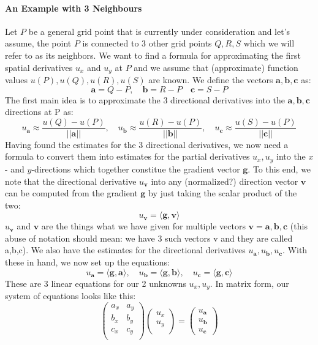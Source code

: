 \paragraph{An Example with 3 Neighbours}
Let $P$ be a general grid point that is currently under consideration and let's assume, the point $P$ is connected to 3 other grid points $Q,R,S$ which we will refer to as its neighbors. We want to find a formula for approximating the first spatial derivatives $u_x$ and $u_y$ at $P$ and we assume that (approximate) function values $u(P),u(Q),u(R),u(S)$ are known. We define the vectors $\mathbf{a,b,c}$ as:
\begin{equation}
\mathbf{a} = Q-P, \quad \mathbf{b} = R-P \quad \mathbf{c} = S-P 
\end{equation}
The first main idea is to approximate the 3 directional derivatives into the $\mathbf{a,b,c}$ directions at P as:
\begin{equation}
 u_{\mathbf{a}} \approx \frac{u(Q)-u(P)}{||\mathbf{a}||}, \quad
 u_{\mathbf{b}} \approx \frac{u(R)-u(P)}{||\mathbf{b}||}, \quad
 u_{\mathbf{c}} \approx \frac{u(S)-u(P)}{||\mathbf{c}||}
\end{equation}
Having found the estimates for the 3 directional derivatives, we now need a formula to convert them into estimates for the partial derivatives $u_x,u_y$ into the $x$- and $y$-directions which together constitue 
the gradient vector $\mathbf{g}$. To this end, we note that the directional derivative $u_\mathbf{v}$ into any (normalized?) direction vector $\mathbf{v}$ can be computed from the gradient $\mathbf{g}$ by just taking the scalar product of the two: 
\begin{equation}
u_\mathbf{v} = \langle \mathbf{g,v} \rangle
\end{equation}
$u_\mathbf{v}$ and $\mathbf{v}$ are the things what we have given for multiple vectors $\mathbf{v = a,b,c}$ (this abuse of notation should mean: we have 3 such vectors v and they are called a,b,c). We also have the
estimates for the directional derivatives $u_\mathbf{a},u_\mathbf{b},u_\mathbf{c}$. With these in hand, we now set up the equations:
\begin{equation}
u_\mathbf{a} = \langle \mathbf{g,a} \rangle, \quad
u_\mathbf{b} = \langle \mathbf{g,b} \rangle, \quad
u_\mathbf{c} = \langle \mathbf{g,c} \rangle
\end{equation}
These are 3 linear equations for our 2 unknowns $u_x,u_y$. In matrix form, our system of equations looks like this:
\begin{equation}
\begin{pmatrix}
  a_x & a_y  \\
  b_x & b_y  \\
  c_x & c_y  \\
\end{pmatrix}
\begin{pmatrix}
  u_x  \\
  u_y  \\
\end{pmatrix}
=
\begin{pmatrix}
  u_{\mathbf{a}}  \\
  u_{\mathbf{b}}  \\
  u_{\mathbf{c}}
\end{pmatrix}
\end{equation}

